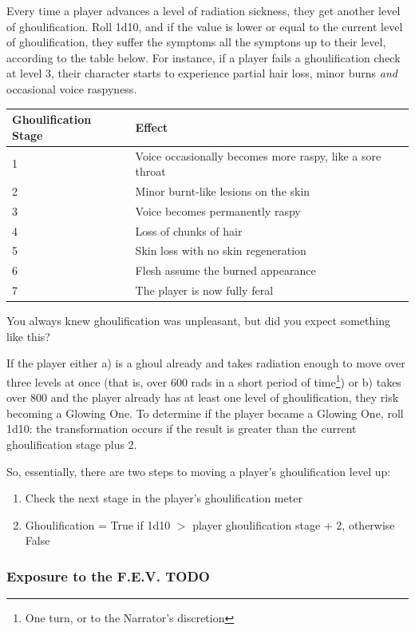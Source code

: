 \documentclass[11pt]{article} %
\begin{document}
Every time a player advances a level of radiation sickness, they get another level of ghoulification. Roll 1d10, and if the value is lower or equal to the current level of ghoulification, they suffer the symptoms all the symptons up to their level, according to the table below. For instance, if a player fails a ghoulification check at level 3, their character starts to experience partial hair loss, minor burns \textit{and} occasional voice raspyness. 

\begin{longtable}{|p{2.8cm}|p{10cm}|}
\hline
\bfseries Ghoulification Stage & \bfseries Effect\\
\hline
\endhead
1 & Voice occasionally becomes more raspy, like a sore throat \\
2 & Minor burnt-like lesions on the skin \\
3 & Voice becomes permanently raspy \\
4 & Loss of chunks of hair \\
5 & Skin loss with no skin regeneration \\
6 & Flesh assume the burned appearance \\
7 & The player is now fully feral \\
\hline
\end{longtable}{\begin{center}You always knew ghoulification was unpleasant, but did you expect something like this?\end{center}}

If the player either a) is a ghoul already and takes radiation enough to move over three levels at once (that is, over 600 rads in a short period of time\footnote{One turn, or to the Narrator's discretion}) or b) takes over 800 and the player already has at least one level of ghoulification, they risk becoming a Glowing One. To determine if the player became a Glowing One, roll 1d10: the transformation occurs if the result is greater than the current ghoulification stage plus 2.

So, essentially, there are two steps to moving a player's ghoulification level up:
\begin{enumerate}
\item Check the next stage in the player's ghoulification meter
\item Ghoulification = True if 1d10 $>$ player ghoulification stage + 2, otherwise False
\end{enumerate}

\subsubsection{Exposure to the F.E.V. TODO}
\end{document}
